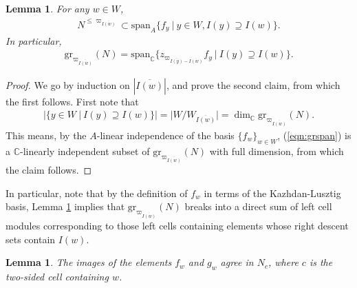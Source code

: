 \documentclass{amsart}
\newtheorem{lemma}[thm]{Lemma}
\theoremstyle{definition}
\begin{document}
\begin{lemma}\label{lem:leqspan}
    For any $w \in W$,
    \begin{align}
        N^{\leq \varpi_{\overline{I(w)}}} \subset \mathrm{span}_A\{f_y~|~y \in W, I(y) \supseteq I(w)\}.
    \end{align}
    In particular, 
    \begin{align}\label{eqn:grspan}
        \mathrm{gr}_{\varpi_{\overline{I(w)}}}(N) = \mathrm{span}_{\mathbb{C}} \{z_{\varpi_{\overline{I(y)} - \overline{I(w)}}}f_y~|~I(y) \supseteq I(w)\}.
    \end{align}
\end{lemma}
\begin{proof}
    We go by induction on $|\overline{I(w)}|$, and prove the second claim, from which the first follows. First note that
    \begin{align}
        |\{y \in W~|~I(y) \supseteq I(w)\}| = |W/W_{\overline{I(w)}}| = \dim_{\mathbb{C}} \mathrm{gr}_{\varpi_{\overline{I(w)}}}(N).
    \end{align}
    This means, by the $A$-linear independence of the basis $\{f_w\}_{w \in W}$, (\ref{eqn:grspan}) is a $\mathbb{C}$-linearly independent subset of $\mathrm{gr}_{\varpi_{\overline{I(w)}}}(N)$ with full dimension, from which the claim follows.
\end{proof}
In particular, note that by the definition of $f_w$ in terms of the Kazhdan-Lusztig basis, Lemma \ref{lem:leqspan} implies that $\mathrm{gr}_{\varpi_{\overline{I(w)}}}(N)$ breaks into a direct sum of left cell modules corresponding to those left cells containing elements whose right descent sets contain $I(w)$. 
\begin{lemma}\label{lem:maintwosided}
    The images of the elements $f_w$ and $g_w$ agree in $N_c$, where $c$ is the two-sided cell containing $w$.
\end{lemma}
\end{document}

